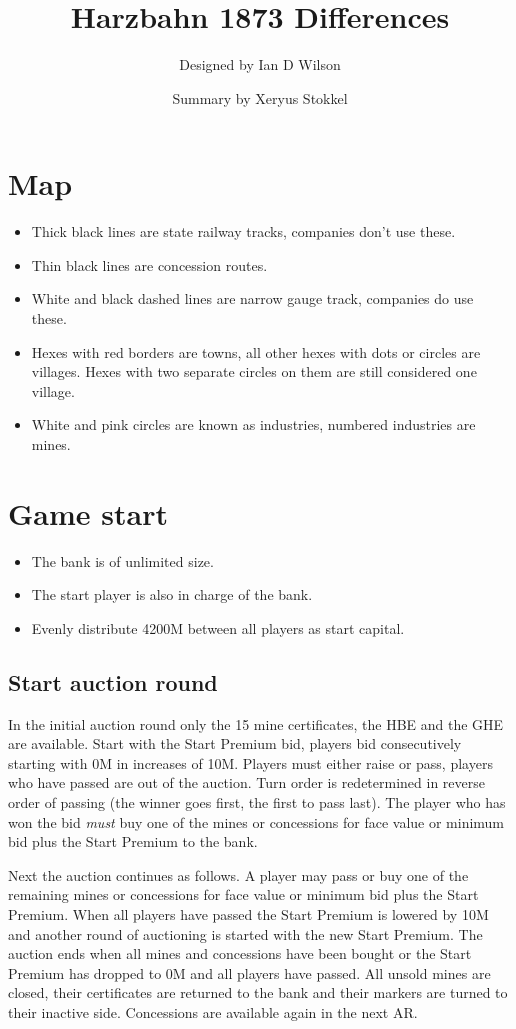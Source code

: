 \documentclass[a4paper,twocolumn]{article}
\title{Harzbahn 1873 Differences}
\author{Designed by Ian D Wilson}
\date{Summary by Xeryus Stokkel}
\begin{document}
\maketitle

\section{Map}
\begin{itemize}
	\item Thick black lines are state railway tracks, companies don't use these.
	\item Thin black lines are concession routes.
	\item White and black dashed lines are narrow gauge track, companies do use
	these.
	\item Hexes with red borders are towns, all other hexes with dots or circles
	are villages. Hexes with two separate circles on them are still considered
	one village.
	\item White and pink circles are known as industries, numbered industries
	are mines.
\end{itemize}

\section{Game start}
\begin{itemize}
	\item The bank is of unlimited size.
	\item The start player is also in charge of the bank.
	\item Evenly distribute 4200M between all players as start capital.
\end{itemize}

\subsection{Start auction round}
In the initial auction round only the 15 mine certificates, the HBE and the GHE
are available. Start with the Start Premium bid, players bid consecutively
starting with 0M in increases of 10M. Players must either raise or pass, players
who have passed are out of the auction. Turn order is redetermined in reverse
order of passing (the winner goes first, the first to pass last). The player who
has won the bid \emph{must} buy one of the mines or concessions for face value
or minimum bid plus the Start Premium to the bank.

Next the auction continues as follows. A player may pass or buy one of the
remaining mines or concessions for face value or minimum bid plus the Start
Premium. When all players have passed the Start Premium is lowered by 10M and
another round of auctioning is started with the new Start Premium. The auction
ends when all mines and concessions have been bought or the Start Premium has
dropped to 0M and all players have passed. All unsold mines are closed, their
certificates are returned to the bank and their markers are turned to their
inactive side. Concessions are available again in the next AR.
\end{document}
